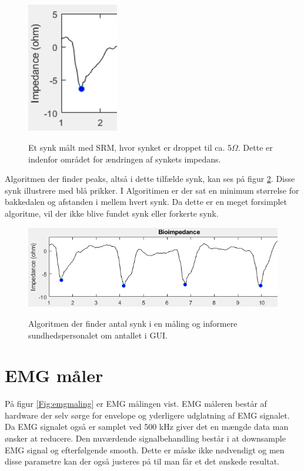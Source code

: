 \begin{figure}[H]
\centering
{\includegraphics[width=4cm]
{Figure/synkfraGUI5ohm}}
\caption{Et synk målt med SRM, hvor synket er droppet til ca. 5$\Omega$. Dette er indenfor området for ændringen af synkets impedans.}
\label{Fig:synkfraGUI5ohm}
\end{figure} 

Algoritmen der finder peaks, altså i dette tilfælde synk, kan ses på figur \ref{Fig:synkfundet}. Disse synk illustrere med blå prikker. I Algoritimen er der sat en minimum størrelse for bakkedalen og afstanden i mellem hvert synk. Da dette er en meget forsimplet algoritme, vil der ikke blive fundet synk eller forkerte synk.

\begin{figure}[H]
\centering
{\includegraphics[width=\linewidth]
{Figure/synkfundet}}
\caption{Algoritmen der finder antal synk i en måling og informere sundhedspersonalet om antallet i GUI.}
\label{Fig:synkfundet}
\end{figure} 



\section{EMG måler}

På figur \ref{Fig:emgmaling} er EMG målingen vist. EMG måleren består af hardware der selv sørge for envelope og yderligere udglatning af EMG signalet. Da EMG signalet også er samplet ved 500 kHz giver det en mængde data man ønsker at reducere. Den nuværdende signalbehandling består i at downsample EMG signal og efterfølgende smooth. Dette er måske ikke nødvendigt og men disse parametre kan der også justeres på til man får et det ønskede resultat. 

